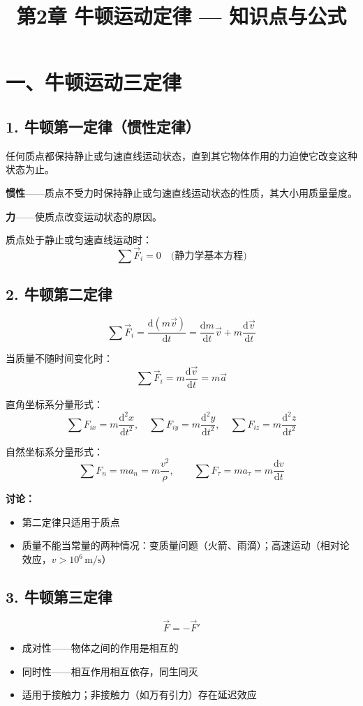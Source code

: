 \documentclass{ctexart}
\title{\textbf{第2章 牛顿运动定律} --- 知识点与公式}
\author{}
\date{}
\begin{document}
\maketitle

\section*{一、牛顿运动三定律}

\subsection*{1. 牛顿第一定律（惯性定律）}
任何质点都保持静止或匀速直线运动状态，直到其它物体作用的力迫使它改变这种状态为止。

\textbf{惯性}——质点不受力时保持静止或匀速直线运动状态的性质，其大小用质量量度。

\textbf{力}——使质点改变运动状态的原因。

质点处于静止或匀速直线运动时：
\[
\sum \vec{F}_i = 0 \quad\text{(静力学基本方程)}
\]

\subsection*{2. 牛顿第二定律}
\[
\sum \vec{F}_i = \frac{\mathrm{d}(m\vec{v})}{\mathrm{d}t} = \frac{\mathrm{d}m}{\mathrm{d}t}\vec{v} + m\frac{\mathrm{d}\vec{v}}{\mathrm{d}t}
\]

当质量不随时间变化时：
\[
\sum \vec{F}_i = m\frac{\mathrm{d}\vec{v}}{\mathrm{d}t} = m\vec{a}
\]

直角坐标系分量形式：
\[
\sum F_{ix} = m\frac{\mathrm{d}^{2}x}{\mathrm{d}t^{2}},\quad
\sum F_{iy} = m\frac{\mathrm{d}^{2}y}{\mathrm{d}t^{2}},\quad
\sum F_{iz} = m\frac{\mathrm{d}^{2}z}{\mathrm{d}t^{2}}
\]

自然坐标系分量形式：
\[
\sum F_n = ma_n = m\frac{v^{2}}{\rho},\qquad
\sum F_{\tau} = ma_{\tau} = m\frac{\mathrm{d}v}{\mathrm{d}t}
\]

\textbf{讨论：}
\begin{itemize}
  \item 第二定律只适用于质点
  \item 质量不能当常量的两种情况：变质量问题（火箭、雨滴）；高速运动（相对论效应，$v > 10^{6}\,\text{m/s}$）
\end{itemize}

\subsection*{3. 牛顿第三定律}
\[
\vec{F} = -\vec{F}'
\]
\begin{itemize}
  \item 成对性——物体之间的作用是相互的
  \item 同时性——相互作用相互依存，同生同灭
  \item 适用于接触力；非接触力（如万有引力）存在延迟效应
\end{itemize}
\end{document}
